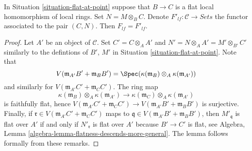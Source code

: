 \begin{lemma}
\label{lemma-flat-at-point-go-up}
In
Situation \ref{situation-flat-at-point}
suppose that $B \to C$ is a flat local homomorphism of local
rings. Set $N = M \otimes_B C$. Denote
$F'_{lf} : \mathcal{C} \to \textit{Sets}$ the functor associated
to the pair $(C, N)$. Then $F_{lf} = F'_{lf}$.
\end{lemma}

\begin{proof}
Let $A'$ be an object of $\mathcal{C}$. Set $C' = C \otimes_A A'$
and $N' = N \otimes_A A' = M' \otimes_{B'} C'$ similarly to the defintions
of $B'$, $M'$ in
Situation \ref{situation-flat-at-point}. Note that
$$
V(\mathfrak m_{A'}B' + \mathfrak m_B B')
=
\Spec( \kappa(\mathfrak m_B) \otimes_A \kappa(\mathfrak m_{A'}) )
$$
and similarly for $V(\mathfrak m_{A'}C' + \mathfrak m_C C')$.
The ring map
$$
\kappa(\mathfrak m_B) \otimes_A \kappa(\mathfrak m_{A'})
\longrightarrow
\kappa(\mathfrak m_C) \otimes_A \kappa(\mathfrak m_{A'})
$$
is faithfully flat, hence
$V(\mathfrak m_{A'}C' + \mathfrak m_C C') \to
V(\mathfrak m_{A'}B' + \mathfrak m_B B')$ is surjective.
Finally, if $\mathfrak r \in V(\mathfrak m_{A'}C' + \mathfrak m_C C')$
maps to $\mathfrak q \in V(\mathfrak m_{A'}B' + \mathfrak m_B B')$, then
$M'_{\mathfrak q}$ is flat over $A'$ if and only if
$N'_{\mathfrak r}$ is flat over $A'$ because $B' \to C'$ is flat, see
Algebra, Lemma \ref{algebra-lemma-flatness-descends-more-general}.
The lemma follows formally from these remarks.
\end{proof}

